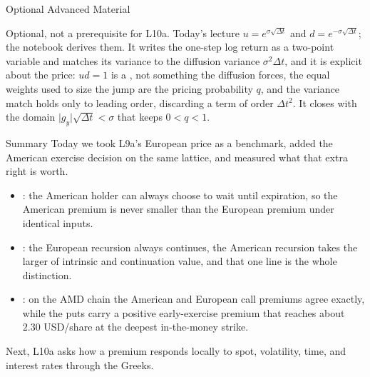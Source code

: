 \documentclass[aspectratio=169,11pt]{beamer}
\newcommand{\gy}{g_y}
\newcommand{\dt}{\Delta t}
\begin{document}
\begin{frame}{Optional Advanced Material}
  \vspace{0.4em}
  {\normalsize\textbf{} \par
  }

  \vspace{0.7em}
  Optional, not a prerequisite for L10a. Today's lecture 
  $u=e^{\sigma\sqrt{\dt}}$ and $d=e^{-\sigma\sqrt{\dt}}$; the notebook derives
  them. It writes the one-step log return as a two-point variable and matches its
  variance to the diffusion variance $\sigma^{2}\dt$, and it is explicit about
  the price: $ud=1$ is a , not
  something the diffusion forces, the equal weights used to size the jump are
   the pricing probability $q$, and the variance match holds only to
  leading order, discarding a term of order $\dt^{2}$. It closes with the domain
  $\lvert\gy\rvert\sqrt{\dt}<\sigma$ that keeps $0<q<1$.
\end{frame}

\begin{frame}{Summary}
  Today we took L9a's European price as a benchmark, added the American exercise
  decision on the same lattice, and measured what that extra right is worth.

  {\large\textbf{}}
  \begin{itemize}\setlength{\itemsep}{0.15em}
    \item {}: the American holder
      can always choose to wait until expiration, so the American premium is
      never smaller than the European premium under identical inputs.
    \item {}: the European
      recursion always continues, the American recursion takes the larger of
      intrinsic and continuation value, and that one line is the whole
      distinction.
    \item {}: on the AMD chain the American and
      European call premiums agree exactly, while the puts carry a
      positive early-exercise premium that reaches about $2.30$ USD/share at the
      deepest in-the-money strike.
  \end{itemize}
  Next, L10a asks how a premium responds locally to spot, volatility, time, and
  interest rates through the Greeks.
\end{frame}
\end{document}
